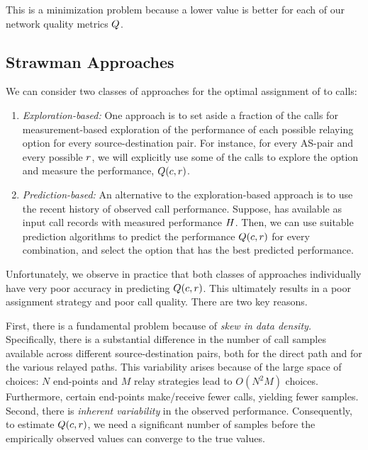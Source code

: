 \noindent This is a minimization problem because a lower value is better for each of our network quality metrics $Q$.

\subsection{Strawman Approaches}
\label{subsec:strawmen}

We can consider two classes of approaches for the optimal assignment of \options to calls:

\begin{enumerate}
\item  {\em Exploration-based:} One approach is to set aside a fraction of the 
 calls for measurement-based exploration of the performance of each possible relaying option for every source-destination pair.  
 For instance, for every AS-pair and every possible %
\option $r$,
 we will explicitly use some of the calls to explore the option and measure the performance, 
  $Q(c, r)$.
  
\item  {\em Prediction-based:} An alternative to the exploration-based approach
 is to use the recent history  of observed call performance. Suppose, \hybrid has available as
 input  call records with measured performance $H$. Then, we can use
 suitable prediction algorithms  to 
 predict the performance $Q(c, r)$ for every combination, and select the option that has the best predicted performance.

\end{enumerate} 

Unfortunately, we observe in practice that both classes of approaches individually  have
very poor accuracy in predicting $Q(c,
r)$. This  ultimately results in a poor assignment strategy and poor call
quality.  There are two key reasons. 

First, there is  a fundamental problem because of {\em skew in data
density.} Specifically, there is a substantial difference in the number of
call samples available across different source-destination pairs, both for the
direct path and for the various relayed paths.  This variability arises because
of the large space of choices: $N$ end-points and $M$ relay strategies lead
to $O(N^2M)$ choices.  Furthermore, certain end-points make/receive
fewer calls, yielding fewer samples. Second, there is {\em inherent variability} in the observed performance.
Consequently, to estimate  $Q(c, r)$, we need  a
significant number of samples before the empirically observed values can
converge to the true values. 


